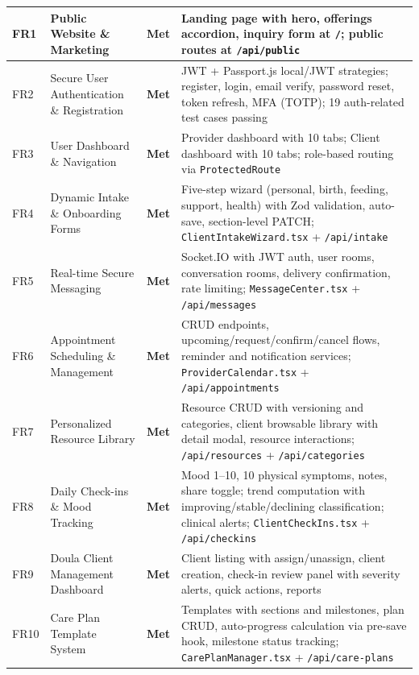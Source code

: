 \documentclass[12pt,letterpaper]{article}
\begin{document}
{\begin{longtable}{|>{\raggedright\arraybackslash}p{1cm}|>{\raggedright\arraybackslash}p{3.2cm}|c|>{\raggedright\arraybackslash}p{6.5cm}|}
FR1 & Public Website \& Marketing & \textbf{Met} & Landing page with hero, offerings accordion, inquiry form at \texttt{/}; public routes at \texttt{/api/public} \\
\hline
\rowcolor{TableRowAlt}
FR2 & Secure User Authentication \& Registration & \textbf{Met} & JWT + Passport.js local/JWT strategies; register, login, email verify, password reset, token refresh, MFA (TOTP); 19 auth-related test cases passing \\
\hline
FR3 & User Dashboard \& Navigation & \textbf{Met} & Provider dashboard with 10 tabs; Client dashboard with 10 tabs; role-based routing via \texttt{ProtectedRoute} \\
\hline
\rowcolor{TableRowAlt}
FR4 & Dynamic Intake \& Onboarding Forms & \textbf{Met} & Five-step wizard (personal, birth, feeding, support, health) with Zod validation, auto-save, section-level PATCH; \texttt{ClientIntakeWizard.tsx} + \texttt{/api/intake} \\
\hline
FR5 & Real-time Secure Messaging & \textbf{Met} & Socket.IO with JWT auth, user rooms, conversation rooms, delivery confirmation, rate limiting; \texttt{MessageCenter.tsx} + \texttt{/api/messages} \\
\hline
\rowcolor{TableRowAlt}
FR6 & Appointment Scheduling \& Management & \textbf{Met} & CRUD endpoints, upcoming/request/confirm/cancel flows, reminder and notification services; \texttt{ProviderCalendar.tsx} + \texttt{/api/appointments} \\
\hline
FR7 & Personalized Resource Library & \textbf{Met} & Resource CRUD with versioning and categories, client browsable library with detail modal, resource interactions; \texttt{/api/resources} + \texttt{/api/categories} \\
\hline
\rowcolor{TableRowAlt}
FR8 & Daily Check-ins \& Mood Tracking & \textbf{Met} & Mood 1--10, 10 physical symptoms, notes, share toggle; trend computation with improving/stable/declining classification; clinical alerts; \texttt{ClientCheckIns.tsx} + \texttt{/api/checkins} \\
\hline
FR9 & Doula Client Management Dashboard & \textbf{Met} & Client listing with assign/unassign, client creation, check-in review panel with severity alerts, quick actions, reports \\
\hline
\rowcolor{TableRowAlt}
FR10 & Care Plan Template System & \textbf{Met} & Templates with sections and milestones, plan CRUD, auto-progress calculation via pre-save hook, milestone status tracking; \texttt{CarePlanManager.tsx} + \texttt{/api/care-plans} \\

\end{longtable}}
\end{document}
